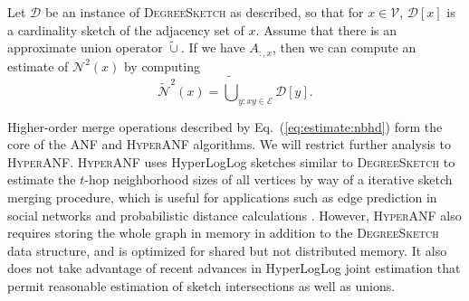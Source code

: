\documentclass[10]{report}
\newcommand{\algoname}[1]{\textnormal{\textsc{#1}}}
\begin{document}
Let $\mathcal{D}$ be an instance of \algoname{DegreeSketch} as described, so that for $x \in \mathcal{V}$, $\mathcal{D}[x]$ is a cardinality sketch of the adjacency set of $x$.
Assume that there is an approximate union operator $\widetilde{\cup}$.
If we have $A_{:,x}$, then we can compute an estimate of $\mathcal{N}^2(x)$ by computing 
%
\begin{equation} \label{eq:estimate:nbhd}
	\widetilde{\mathcal{N}}^2(x) 
	= \widetilde{\bigcup}_{y: xy \in \mathcal{E}} \mathcal{D}[y].
\end{equation}
%

Higher-order merge operations described by Eq.~(\ref{eq:estimate:nbhd}) form the core of the \algoname{ANF} \cite{palmer2002anf} and \algoname{HyperANF} \cite{boldi2011hyperanf} algorithms.
We will restrict further analysis to \algoname{HyperANF}.
\algoname{HyperANF} uses HyperLogLog sketches similar to \algoname{DegreeSketch} to estimate the $t$-hop neighborhood sizes of all vertices by way of a iterative sketch merging procedure, which is useful for applications such as edge prediction in social networks \cite{gupta2013wtf} and probabilistic distance calculations \cite{boldi2011hyperanf, myers2014information}.
However, \algoname{HyperANF} also requires storing the whole graph in memory in addition to the \algoname{DegreeSketch} data structure, and is optimized for shared but not distributed memory. 
It also does not take advantage of recent advances in HyperLogLog joint estimation that permit reasonable estimation of sketch intersections as well as unions.
\end{document}
